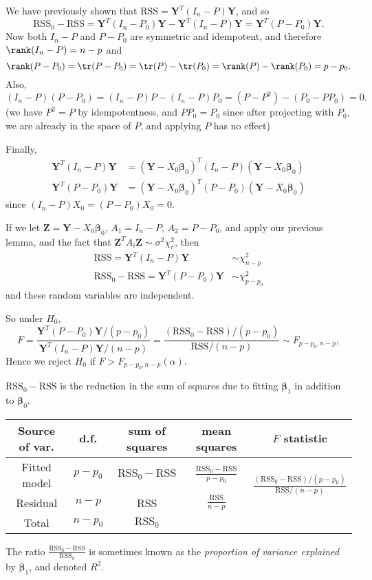 \documentclass[a4paper]{article}
\begin{document}
We have previously shown that $\mathrm{RSS} = \mathbf{Y}^T(I_n - P)\mathbf{Y}$, and so
\[
  \mathrm{RSS}_0 - \mathrm{RSS} = \mathbf{Y}^T(I_n - P_0)\mathbf{Y} - \mathbf{Y}^T(I_n - P)\mathbf{Y} = \mathbf{Y}^T(P - P_0)\mathbf{Y}.
\]
Now both $I_n - P$ and $P - P_0$ are symmetric and idempotent, and therefore $\rank(I_n - P) = n - p$ and
\[
  \rank(P - P_0) = \tr(P - P_0) = \tr(P) - \tr(P_0) = \rank(P) - \rank(P_0) = p - p_0.
\]
Also,
\[
  (I_n - P)(P - P_0) = (I_n - P)P - (I_n - P)P_0 = (P - P^2) - (P_0 - PP_0) = 0.
\]
(we have $P^2 = P$ by idempotentness, and $PP_0 = P_0$ since after projecting with $P_0$, we are already in the space of $P$, and applying $P$ has no effect)

Finally,
\begin{align*}
  \mathbf{Y}^T(I_n - P)\mathbf{Y} &= (\mathbf{Y} - X_0 \boldsymbol\beta_0)^T(I_n - P)(\mathbf{Y} - X_0 \boldsymbol\beta_0)\\
  \mathbf{Y}^T(P - P_0)\mathbf{Y} &= (\mathbf{Y} - X_0 \boldsymbol\beta_0)^T(P - P_0)(\mathbf{Y} - X_0 \boldsymbol\beta_0)
\end{align*}
since $(I_n - P)X_0 = (P - P_0)X_0 = 0$.

If we let $\mathbf{Z} = \mathbf{Y} - X_0 \boldsymbol\beta_0$, $A_1 = I_n - P$, $A_2 = P - P_0$, and apply our previous lemma, and the fact that $\mathbf{Z}^TA_i \mathbf{Z} \sim \sigma^2 \chi_r^2$, then
\begin{align*}
  \mathrm{RSS} = \mathbf{Y}^T(I_n - P)\mathbf{Y} &\sim \chi_{n - p}^2\\
  \mathrm{RSS}_0 - \mathrm{RSS} = \mathbf{Y}^T(P - P_0)\mathbf{Y} &\sim \chi^2_{p - p_0}
\end{align*}
and these random variables are independent.

So under $H_0$,
\[
  F = \frac{\mathbf{Y}^T(P - P_0)\mathbf{Y}/(p - p_0)}{\mathbf{Y}^T(I_n - P)\mathbf{Y}/(n - p)} = \frac{(\mathrm{RSS}_0 - \mathrm{RSS})/(p - p_0)}{\mathrm{RSS}/(n - p)} \sim F_{p - p_0, n - p},
\]
Hence we reject $H_0$ if $F > F_{p - p_0, n - p}(\alpha)$.

$\mathrm{RSS}_0 - \mathrm{RSS}$ is the reduction in the sum of squares due to fitting $\boldsymbol\beta_1$ in addition to $\boldsymbol\beta_0$.
\begin{center}
  \begin{tabular}{ccccc}
    \toprule
    Source of var. & d.f. & sum of squares & mean squares & $F$ statistic\\
    \midrule
    Fitted model & $p - p_0$ & $\mathrm{RSS}_0 - \mathrm{RSS}$ & $\frac{\mathrm{RSS}_0 - \mathrm{RSS}}{p - p_0}$ & \multirow{2}{*}{$\frac{(\mathrm{RSS}_0 - \mathrm{RSS})/(p - p_0)}{\mathrm{RSS}/(n - p)}$}\\
    Residual & $n - p$ & RSS & $\frac{\mathrm{RSS}}{n - p}$\\
    \midrule
    Total & $n - p_0$ & $\mathrm{RSS}_0$\\
    \bottomrule
  \end{tabular}
\end{center}
The ratio $\frac{\mathrm{RSS}_0 - \mathrm{RSS}}{\mathrm{RSS}_0}$ is sometimes known as the \emph{proportion of variance explained} by $\boldsymbol\beta_1$, and denoted $R^2$.
\end{document}
